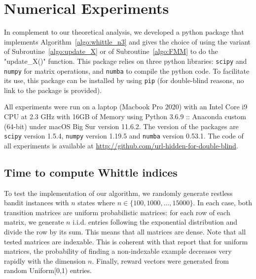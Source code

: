 \documentclass[acmsmall,screen,anonymous]{acmart}
\begin{document}
\section{Numerical Experiments}
\label{sec:numerical}

In complement to our theoretical analysis, we developed a python package that implements Algorithm~\ref{algo:whittle_n3} and gives the choice of using the variant of Subroutine~\ref{algo:update_X} or of Subroutine~\ref{algo:FMM} to do the "update\_X()" function. This package relies on three python libraries: \texttt{scipy} and \texttt{numpy} for matrix operations, and \texttt{numba} to compile the python code. To facilitate its use, this package can be installed by using \texttt{pip} (for double-blind reasons, no link to the package is provided).

All experiments were run on a laptop (Macbook Pro 2020) with an Intel Core i9 CPU at 2.3 GHz with 16GB of Memory using Python 3.6.9 :: Anaconda custom (64-bit) under macOS Big Sur version 11.6.2. The version of the packages are \texttt{scipy} version 1.5.4, \texttt{numpy} version 1.19.5 and \texttt{numba} version 0.53.1. The code of all experiments is available at \url{http://github.com/url-hidden-for-double-blind}.








\subsection{Time to compute Whittle indices}

To test the implementation of our algorithm, we randomly generate restless bandit instances with $n$ states where $n\in\{100,1000,\dots,15000\}$. In each case, both transition matrices are uniform probabilistic matrices: for each row of each matrix, we generate $n$ i.i.d. entries following the exponential distribution and divide the row by its sum. This means that all matrices are dense. Note that all tested matrices are indexable. This is coherent with \cite{gast2020exponential,nino2007dynamic} that report that for uniform matrices, the probability of finding a non-indexable example decreases very rapidly with the dimension $n$. Finally, reward vectors were generated from random Uniform[0,1) entries.
\end{document}
